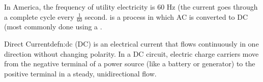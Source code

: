 In America, the frequency of utility electricity is 60 Hz (the current goes through a complete cycle every $\frac{1}{60}$ second.  is a process in which AC is converted to DC (most commonly done using a .

\begin{defn}{Direct Current}{defn:dc}
 (DC) is an electrical current that flows continuously in one direction without changing polarity. In a DC circuit, electric charge carriers move from the negative terminal of a power source (like a battery or generator) to the positive terminal in a steady, unidirectional flow.
\end{defn}











